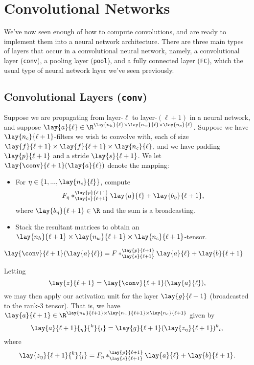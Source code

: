 


\section{Convolutional Networks}


We've now seen enough of how to compute convolutions, and are ready to implement them into a neural network architecture. There are three main types of layers that occur in a convolutional neural network, namely, a convolutional layer (\texttt{conv}), a pooling layer (\texttt{pool}), and a fully connected layer (\texttt{FC}), which the usual type of neural network layer we've seen previously.


\subsection{Convolutional Layers (\texttt{conv})}

Suppose we are propagating from layer-$\ell$ to layer-$(\ell+1)$ in a neural network, and suppose $\lay{a}{\ell}\in\R^{\lay{n_h}{\ell}\times\lay{n_w}{\ell}\times\lay{n_c}{\ell}}$.  Suppose we have $\lay{n_c}{\ell+1}$-filters we wish to convolve with, each of size $\lay{f}{\ell+1}\times\lay{f}{\ell+1}\times\lay{n_c}{\ell}$, and we have padding $\lay{p}{\ell+1}$ and a stride $\lay{s}{\ell+1}$.  We let $\lay{\conv}{\ell+1}(\lay{a}{\ell})$ denote the mapping:
\begin{itemize}
	\item For $\eta\in\{1,...,\lay{n_c}{\ell}\}$, compute
		$$F_\eta *^{\lay{p}{\ell+1}}_{\lay{s}{\ell+1}}\lay{a}{\ell}+\lay{b_\eta}{\ell+1},$$
		where $\lay{b_\eta}{\ell+1}\in\R$ and the sum is a broadcasting.
	\item Stack the resultant matrices to obtain an $\lay{n_h}{\ell+1}\times\lay{n_w}{\ell+1}\times\lay{n_c}{\ell+1}$-tensor.
\end{itemize}
\begin{align*}
	\lay{\conv}{\ell+1}(\lay{a}{\ell})&=F*^{\lay{p}{\ell+1}}_{\lay{s}{\ell+1}}\lay{a}{\ell}+\lay{b}{\ell+1}
\end{align*}

Letting
$$\lay{z}{\ell+1}=\lay{\conv}{\ell+1}(\lay{a}{\ell}),$$
we may then apply our activation unit for the layer $\lay{g}{\ell+1}$ (broadcasted to the rank-$3$ tensor).  That is, we have $\lay{a}{\ell+1}\in\R^{\lay{n_h}{\ell+1}\times\lay{n_w}{\ell+1}\times\lay{n_c}{\ell+1}}$ given by
$$\lay{a}{\ell+1}{_\eta}{^k}{_l}=\lay{g}{\ell+1}(\lay{z_\eta}{\ell+1}){^k}{_l},$$
where
$$\lay{z_\eta}{\ell+1}{^k}{_l}=F_\eta*^{\lay{p}{\ell+1}}_{\lay{s}{\ell+1}}\lay{a}{\ell}+\lay{b}{\ell+1}.$$


